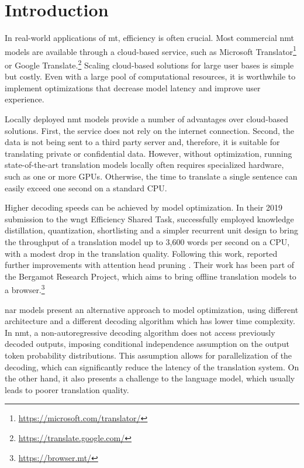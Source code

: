 



\chapter{Introduction}

In real-world applications of \ac{mt}, efficiency is often crucial.  Most
commercial \ac{nmt} models are available through a cloud-based service, such as
Microsoft Translator\footnote{\url{https://microsoft.com/translator/}} or
Google Translate.\footnote{\url{https://translate.google.com/}} Scaling
cloud-based solutions for large user bases is simple but costly. Even with a
large pool of computational resources, it is worthwhile to implement
optimizations that decrease model latency and improve user experience.

Locally deployed \ac{nmt} models provide a number of advantages over
cloud-based solutions. First, the service does not rely on the internet
connection. Second, the data is not being sent to a third party server and,
therefore, it is suitable for translating private or confidential data.
However, without optimization, running state-of-the-art translation models
locally often requires specialized hardware, such as one or more
GPUs. Otherwise, the time to translate a single sentence can easily exceed one
second on a standard CPU.

Higher decoding speeds can be achieved by model optimization. In their 2019
submission to the \ac{wngt} Efficiency Shared Task,
\citet{kim-etal-2019-research} successfully employed knowledge distillation,
quantization, shortlisting \citep{jean-etal-2015-using} and a simpler recurrent
unit design to bring the throughput of a translation model up to 3,600 words
per second on a CPU, with a modest drop in the translation quality. Following
this work, \citet{bogoychev-etal-2020-edinburghs} reported further improvements
with attention head pruning \citep{voita-etal-2019-analyzing}. Their work has
been part of the Bergamot Research Project, which aims to bring offline
translation models to a browser.\footnote{\url{https://browser.mt/}}

\Ac{nar} models present an alternative approach to model optimization, using
different architecture and a different decoding algorithm which has lower time
complexity.  In \ac{nmt}, a non-autoregressive decoding algorithm does not
access previously decoded outputs, imposing conditional independence assumption
on the output token probability distributions. This assumption allows for
parallelization of the decoding, which can significantly reduce the latency of
the translation system. On the other hand, it also presents a challenge to the
language model, which usually leads to poorer translation quality.


